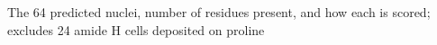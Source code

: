 The 64 predicted nuclei, number of residues present, and how each is scored; excludes 24 amide H cells deposited on proline
